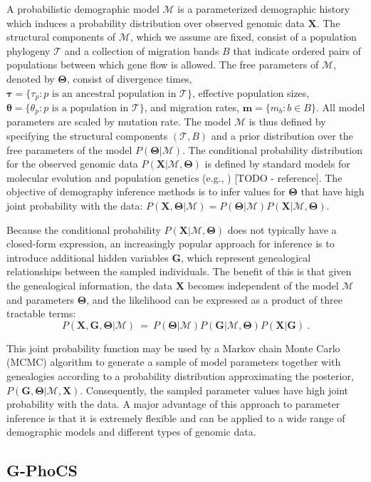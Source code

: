 \documentclass[11pt]{article}
\newcommand{\vect}[1]{\boldsymbol{\mathbf{#1}}}
\newcommand{\X}{\vect{X}}
\newcommand{\M}{\mathcal{M}}
\newcommand{\Tr}{\mathcal{T}}
\newcommand{\G}{\vect{G}}
\newcommand{\T}{\vect{\Theta}}
\newcommand{\1}{\mathbbm{1}}
\newcommand{\gp}{G-PhoCS }
\newcommand{\taus}{\vect\tau}
\newcommand{\thetas}{\vect\theta}
\newcommand{\migs}{\vect{m}}
\begin{document}
A probabilistic demographic model $\M$ is a parameterized demographic history which induces a probability distribution over observed genomic data $\X$.
%
The structural components of $\M$, which we assume are fixed, consist of a population phylogeny $\Tr$ and a collection
of migration bands $B$ that indicate ordered pairs of populations between which gene flow is allowed.
%
The free parameters of $\M$, denoted by $\T$, consist of divergence times, $\taus=\{\tau_p:p \text{ is an ancestral population in } \Tr\}$,
effective population sizes, $\thetas=\{\theta_p: p \text{ is a population in } \Tr\}$, and migration rates, $\migs=\{m_b:b \in B\}$.
%
All model parameters are scaled by mutation rate.
%
The model $\M$ is thus defined by specifying the structural components $(\Tr,B)$ and a prior distribution over the free parameters of the model $P(\T|\M)$.
%
The conditional probability distribution for the observed genomic data $P(\X|\M,\T)$ is defined by standard models for molecular evolution and population genetics (e.g., \cite{JUKECANT69,KING82A}) [TODO - reference].
%
The objective of demography inference methods is to infer values for $\T$ that have high joint probability with the data:
$P(\X,\T|\M)=P(\T|\M)P(\X|\M,\T)$.

%
Because the conditional probability $P(\X|\M,\T)$ does not typically have a closed-form expression, an increasingly popular approach for
inference is to introduce additional hidden variables $\G$, which represent genealogical relationships
between the sampled individuals.
%
The benefit of this is that given the genealogical information, the data $\X$ becomes independent of the model $\M$ and parameters $\T$,
and the likelihood can be expressed as a product of three tractable terms:
%
%
\begin{equation}\label{eq:likelihood}
 P(\X,\G,\T|\M) ~=~ P(\T|\M) P(\G|\M,\T) P(\X|\G)~.
\end{equation}
%
%

This joint probability function may be used by a Markov chain Monte Carlo (MCMC) algorithm to generate a sample of model parameters
together with genealogies according to a probability distribution approximating the posterior, $P(\G,\T|\M,\X)$.
%
Consequently, the sampled parameter values have high joint probability with the data.
%
A major advantage of this approach to parameter inference is that it is extremely flexible and can be applied to a wide range of demographic models and different types of genomic data.
%


\subsection{\gp}
\end{document}
